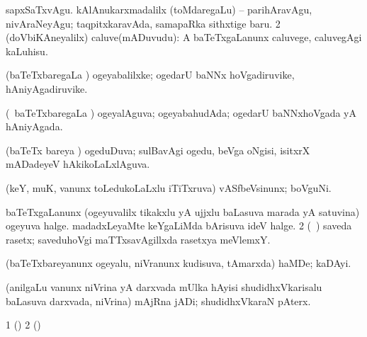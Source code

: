 {\noindent 
\gl{\pagu}
\expl{}
\bmng
\bnum
{}  
\banum
{} sapxSaTxvAgu. 
 kAlAnukarxmadalilx (toMdaregaLu) -- parihAravAgu, nivAraNeyAgu; taqpitxkaravAda, samapaRka sithxtige baru. 
\eanum
\numie
\num{2}  (doVbiKAneyalilx) caluve(mADuvudu):  A baTeTxgaLanunx caluvege, caluvegAgi kaLuhisu. 
\enum
\emng
\eentry

\bentry
{} 
\gl{\saMkiSx}
\expl{}
\bmng
{} 
\emng
\eentry

\bentry
{} 
\gl{\nA}
\expl{}
\bmng
(baTeTxbaregaLa \vi) ogeyabalilxke; ogedarU baNNx hoVgadiruvike, hAniyAgadiruvike. 
\emng
\eentry

\bentry
{} 
\gl{\gu}
\expl{}
\bmng
(\kanmu\ baTeTxbaregaLa \vi) ogeyalAguva; ogeyabahudAda; ogedarU baNNxhoVgada yA hAniyAgada. 
\emng
\eentry

\bentry
{} 
\gl{\gu}
\expl{}
\bmng
(baTeTx bareya \vi) ogeduDuva; sulBavAgi ogedu, beVga oNgisi, isitxrX mADadeyeV hAkikoLaLxlAguva. 
\emng
\eentry

\bentry
{} 
\gl{\nA}
\expl{}
\bmng
(keY, muK, \mo vanunx toLedukoLaLxlu iTiTxruva) vASfbeVsinunx; boVguNi. 
\emng
\eentry

\bentry
{} 
\gl{\nA}
\expl{}
\bmng
\bnum
{} 
\banum
{} baTeTxgaLanunx (ogeyuvalilx tikakxlu yA ujjxlu baLasuva marada yA satuvina) ogeyuva halge. 
 madadxLeyaMte keYgaLiMda bArisuva ideV halge. 
\eanum
\numie
\num{2} (\kanu\ \ame) saveda rasetx; saveduhoVgi maTTxsavAgillxda rasetxya meVlemxY. 
\enum
\emng
\eentry

\bentry
{} 
\gl{\nA}
\expl{}
\bmng
(baTeTxbareyanunx ogeyalu, niVranunx kudisuva, tAmarxda) haMDe; kaDAyi. 
\emng
\eentry

\bentry
{} 
\gl{\nA}
\expl{}
\bmng
(anilgaLu \mo vanunx niVrina yA darxvada mUlka hAyisi shudidhxVkarisalu baLasuva darxvada, niVrina) mAjRna jADi; shudidhxVkaraN pAterx. 
\emng
\eentry

\bentry
{} 
\gl{\nA}
\expl{}
\bmng
{} 
\emng
\eentry

\bentry
{} 
\gl{\nA}
\expl{}
\bmng
\bnum
\num{1} (\birx)  
\num{2} (\ame) 
\enum
\emng
\eentry

}
